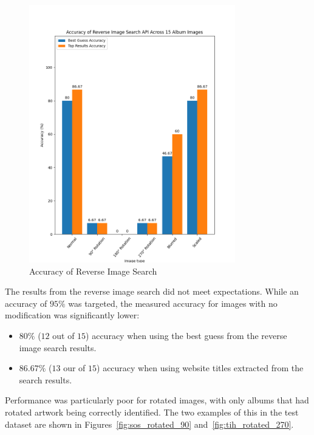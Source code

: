 \begin{figure} [H]
    \centering
    \includegraphics[width=0.8\textwidth]{figures/evaluation_graphs_ris.png}
    \caption{Accuracy of Reverse Image Search}
    \label{fig:album-scanning-results-ris}
\end{figure}

The results from the reverse image search did not meet expectations. While an accuracy of $95\%$ was targeted, the measured accuracy for images with no modification was significantly lower:
\begin{itemize}
    \item $80\%$ ($12$ out of $15$) accuracy when using the best guess from the reverse image search results.
    \item $86.67\%$ ($13$ our of $15$) accuracy when using website titles extracted from the search results.
\end{itemize}

Performance was particularly poor for rotated images, with only albums that had rotated artwork being correctly identified. The two examples of this in the test dataset are shown in Figures~\ref{fig:sos_rotated_90} and~\ref{fig:tih_rotated_270}.

